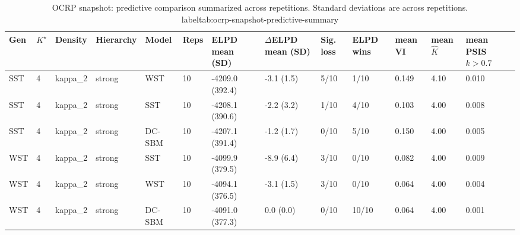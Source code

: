 \begin{table}[!h]
\centering
\caption{OCRP snapshot: predictive comparison summarized across repetitions. Standard deviations are across repetitions.\\label{tab:ocrp-snapshot-predictive-summary}}
\centering
\begin{tabular}[t]{lllllllllllll}
\toprule
Gen & $K^\star$ & Density & Hierarchy & Model & Reps & ELPD mean (SD) & $\Delta$ELPD mean (SD) & Sig. loss & ELPD wins & mean VI & mean $\hat K$ & mean PSIS $k>0.7$\\
\midrule
SST & 4 & kappa_2 & strong & WST & 10 & -4209.0 (392.4) & -3.1 (1.5) & 5/10 & 1/10 & 0.149 & 4.10 & 0.010\\
SST & 4 & kappa_2 & strong & SST & 10 & -4208.1 (390.6) & -2.2 (3.2) & 1/10 & 4/10 & 0.103 & 4.00 & 0.008\\
SST & 4 & kappa_2 & strong & DC-SBM & 10 & -4207.1 (391.4) & -1.2 (1.7) & 0/10 & 5/10 & 0.150 & 4.00 & 0.005\\
WST & 4 & kappa_2 & strong & SST & 10 & -4099.9 (379.5) & -8.9 (6.4) & 3/10 & 0/10 & 0.082 & 4.00 & 0.009\\
WST & 4 & kappa_2 & strong & WST & 10 & -4094.1 (376.5) & -3.1 (1.5) & 3/10 & 0/10 & 0.064 & 4.00 & 0.004\\
WST & 4 & kappa_2 & strong & DC-SBM & 10 & -4091.0 (377.3) & 0.0 (0.0) & 0/10 & 10/10 & 0.064 & 4.00 & 0.001\\
\bottomrule
\end{tabular}
\end{table}
